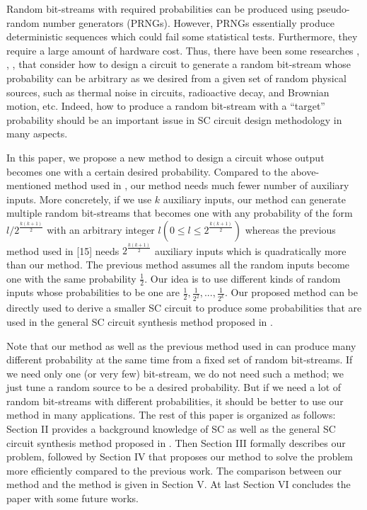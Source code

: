 \documentclass[10pt,conference]{IEEEtran}
\begin{document}
\par
Random bit-streams with required probabilities can be
produced using pseudo-random number generators (PRNGs).
However, PRNGs essentially produce deterministic sequences
which could fail some statistical tests. Furthermore, they
require a large amount of hardware cost. Thus, there have
been some researches \cite{three}, \cite{ten}, \cite{twelve}, \cite{thirteen} that consider how
to design a circuit to generate a random bit-stream whose
probability can be arbitrary as we desired from a given set
of random physical sources, such as thermal noise in circuits,
radioactive decay, and Brownian motion, etc. Indeed, how to
produce a random bit-stream with a “target” probability should
be an important issue in SC circuit design methodology in
many aspects.

\par
In this paper, we propose a new method to design a circuit
whose output becomes one with a certain desired probability.
Compared to the above-mentioned method used in \cite{fifteen}, our
method needs much fewer number of auxiliary inputs. More
concretely, if we use $k$ auxiliary inputs, our method can
generate multiple random bit-streams that becomes one with
any probability of the form $l/2^{\frac{k(k+1)}{2}}$
with an arbitrary integer $l (0\leq l\leq2^{\frac{k(k+1)}{2}})$ whereas the previous method used in [15] needs $2^{\frac{k(k+1)}{2}}$ auxiliary inputs which is quadratically more than our method. The previous method assumes all the random inputs become one with the same probability $\frac{1} {2}$. Our idea is to use different kinds of random inputs whose probabilities to be one are $\frac{1}{2},\frac{1}{2^{2}},...,\frac{1}{2^{k}}$. Our proposed method can be directly used to derive a smaller SC circuit to produce some probabilities that are used in the general SC circuit synthesis method proposed in \cite{fifteen}.

\par
Note that our method as well as the previous method used
in \cite{fifteen} can produce many different probability at the same time
from a fixed set of random bit-streams. If we need only one
(or very few) bit-stream, we do not need such a method; we
just tune a random source to be a desired probability. But if we
need a lot of random bit-streams with different probabilities,
it should be better to use our method in many applications.
The rest of this paper is organized as follows: Section II
provides a background knowledge of SC as well as the general
SC circuit synthesis method proposed in \cite{fifteen}. Then Section III
formally describes our problem, followed by Section IV that
proposes our method to solve the problem more efficiently
compared to the previous work. The comparison between our
method and the method \cite{fifteen} is given in Section V. At last
Section VI concludes the paper with some future works.
\end{document}
